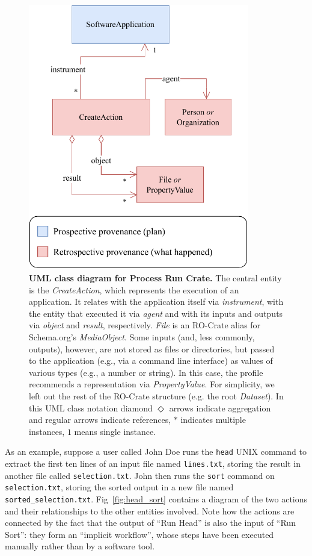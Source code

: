 \documentclass[10pt,letterpaper]{article}
\begin{document}
\begin{figure}[!ht]
\includegraphics[width=26em]{wrroc-figure1.drawio.pdf}
\caption{{\bf UML class diagram for Process Run Crate.}
The central entity is the \emph{CreateAction}, which represents the execution of an application.
It relates with the application itself via \emph{instrument}, with the entity that executed it via \emph{agent} and with its inputs and outputs via \emph{object}
and \emph{result}, respectively. 
\emph{File} is an RO-Crate alias for Schema.org's \emph{MediaObject}.
Some inputs (and, less commonly, outputs), however, are not stored as files or directories, but passed to the application (e.g., via a command line interface) as values of various types (e.g., a number or string). In this case, the profile recommends a representation via \emph{PropertyValue}. 
For simplicity, we left out the rest of the RO-Crate structure (e.g. the root \emph{Dataset}). In this UML class notation diamond $\Diamond$ arrows indicate aggregation and regular arrows indicate references, $*$ indicates multiple instances, $1$ means single instance.  
}
\label{fig:process_crate_er}
\end{figure}

As an example,
suppose a user called John Doe runs the \texttt{head} UNIX command to extract the first ten lines of an input file named \texttt{lines.txt}, storing the result in another file called \texttt{selection.txt}.
John then runs the \texttt{sort}
command on \texttt{selection.txt}, storing the sorted output in a new file named \texttt{sorted\_selection.txt}.
Fig~\ref{fig:head_sort} contains a diagram of the two actions and their relationships to the other entities involved.
Note how the actions are connected by the fact that the output of ``Run Head'' is also the input of ``Run Sort'': they form an ``implicit workflow'', whose steps have been executed manually rather than by a software tool.
\end{document}
